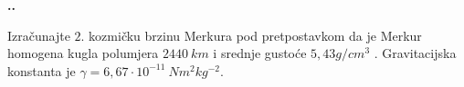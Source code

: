 

\noindent 
\textbf{
\thecjelina.\thezadatak.}

Izračunajte $2.$ kozmičku brzinu Merkura pod pretpostavkom da je Merkur homogena kugla polumjera $2440\ km$ i srednje gustoće $5,43 g/cm^3$ . Gravitacijska konstanta je $\gamma = 6,67\cdot  10^{−11}\ Nm^2kg^{−2}$.%


